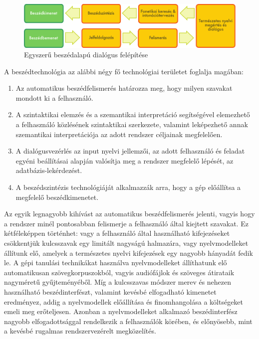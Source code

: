 \begin{multicols}{2}
\begin{figure}[htb]
  \center 
  \includegraphics[width=\textwidth]{../_media/hungarian/simple_speech-based_dialogue_architecture}
  \caption{Egyszerű beszédalapú dialógus felépítése}
  \label{fig:dialoguearch_de}
\end{figure}

A beszédtechnológia az alábbi négy fő technológiai területet foglalja magában:

\begin{enumerate}
      \item Az automatikus beszédfelismerés határozza meg, hogy milyen szavakat mondott ki a felhasználó.
      \item A szintaktikai elemzés és a szemantikai interpretáció segítségével ele\-mez\-he\-tő a felhasználó közlésének szintaktikai szerkezete, valamint leképezhető annak szemantikai interpretációja az adott rendszer céljainak megfelelően. 
      \item A dialógusvezérlés az input nyelvi jellemzői, az adott felhasználó és feladat egyéni beállításai alapján valósítja meg a rendszer megfelelő lépését, az adatbázis-lekérdezést.     
      \item A beszédszintézis technológiáját alkalmazzák arra, hogy a gép előállítsa a megfelelő beszédkimenetet. 
    \end{enumerate}

Az egyik legnagyobb kihívást az automatikus beszédfelismerés jelenti, vagyis hogy a rendszer minél pontosabban felismerje a felhasználó által kiejtett szavakat. Ez kétféleképpen történhet: vagy a felhasználó által használható kifejezéseket csökkentjük kulcsszavak egy limitált nagy\-sá\-gú halmazára, vagy nyelvmodelleket állítunk elő, amelyek a természetes nyelvi kifejezések egy nagyobb hányadát fedik le. A gépi tanulási technikákat használva nyelvmodelleket állíthatunk elő auto\-ma\-ti\-ku\-san szövegkorpuszokból, vagyis audiófájlok és szöveges átirataik nagyméretű gyűjteményéből. Míg a kulcsszavas módszer merev és nehezen használható beszédinterfészt, valamint kevésbé elfogadható kimenetet eredményez, addig a nyelv\-mo\-del\-lek előállítása és finomhangolása a költségeket emeli meg erőteljesen. Azonban a nyelvmodelleket alkalmazó beszédinterfész nagyobb elfogadottsággal rendelkezik a felhasználók körében, és előnyösebb, mint a kevésbé rugalmas rendszervezérelt megközelítés. 


\end{multicols}
